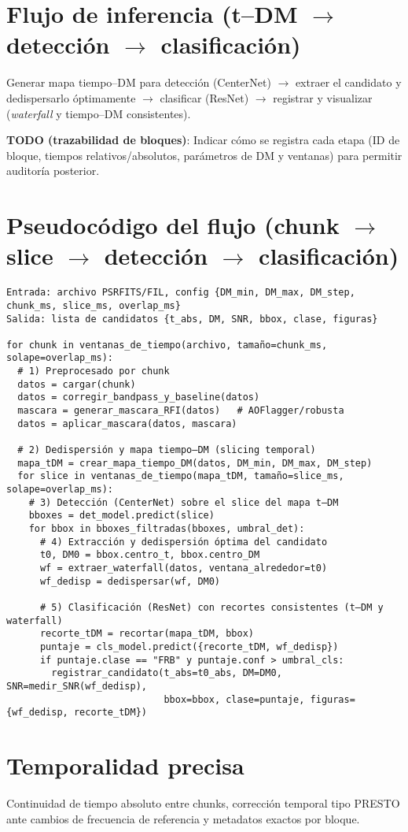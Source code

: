 \section{Flujo de inferencia (t--DM $\to$ detección $\to$ clasificación)}
Generar mapa tiempo--DM para detección (CenterNet) \(\to\) extraer el candidato y dedispersarlo óptimamente \(\to\) clasificar (ResNet) \(\to\) registrar y visualizar (\textit{waterfall} y tiempo--DM consistentes).

\textbf{TODO (trazabilidad de bloques)}: Indicar cómo se registra cada etapa (ID de bloque, tiempos relativos/absolutos, parámetros de DM y ventanas) para permitir auditoría posterior.

\section{Pseudocódigo del flujo (chunk $\to$ slice $\to$ detección $\to$ clasificación)}
\begin{verbatim}
Entrada: archivo PSRFITS/FIL, config {DM_min, DM_max, DM_step, chunk_ms, slice_ms, overlap_ms}
Salida: lista de candidatos {t_abs, DM, SNR, bbox, clase, figuras}

for chunk in ventanas_de_tiempo(archivo, tamaño=chunk_ms, solape=overlap_ms):
  # 1) Preprocesado por chunk
  datos = cargar(chunk)
  datos = corregir_bandpass_y_baseline(datos)
  mascara = generar_mascara_RFI(datos)   # AOFlagger/robusta
  datos = aplicar_mascara(datos, mascara)

  # 2) Dedispersión y mapa tiempo–DM (slicing temporal)
  mapa_tDM = crear_mapa_tiempo_DM(datos, DM_min, DM_max, DM_step)
  for slice in ventanas_de_tiempo(mapa_tDM, tamaño=slice_ms, solape=overlap_ms):
    # 3) Detección (CenterNet) sobre el slice del mapa t–DM
    bboxes = det_model.predict(slice)
    for bbox in bboxes_filtradas(bboxes, umbral_det):
      # 4) Extracción y dedispersión óptima del candidato
      t0, DM0 = bbox.centro_t, bbox.centro_DM
      wf = extraer_waterfall(datos, ventana_alrededor=t0)
      wf_dedisp = dedispersar(wf, DM0)

      # 5) Clasificación (ResNet) con recortes consistentes (t–DM y waterfall)
      recorte_tDM = recortar(mapa_tDM, bbox)
      puntaje = cls_model.predict({recorte_tDM, wf_dedisp})
      if puntaje.clase == "FRB" y puntaje.conf > umbral_cls:
        registrar_candidato(t_abs=t0_abs, DM=DM0, SNR=medir_SNR(wf_dedisp),
                            bbox=bbox, clase=puntaje, figuras={wf_dedisp, recorte_tDM})
\end{verbatim}

\section{Temporalidad precisa}
Continuidad de tiempo absoluto entre chunks, corrección temporal tipo PRESTO ante cambios de frecuencia de referencia y metadatos exactos por bloque.



